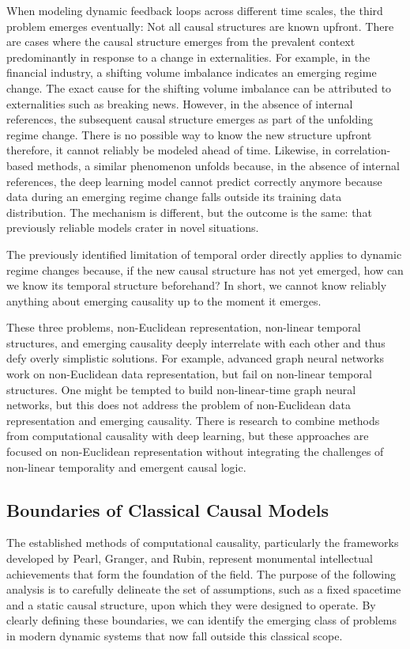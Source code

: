 When modeling dynamic feedback loops across different time scales, the third problem emerges eventually: Not all causal structures are known upfront. There are cases where the causal structure emerges from the prevalent context predominantly in response to a change in externalities. For example, in the financial industry, a shifting volume imbalance indicates an emerging regime change. The exact cause for the shifting volume imbalance can be attributed to externalities such as breaking news. However, in the absence of internal references, the subsequent  causal structure emerges as part of the unfolding regime change. There is no possible way to know the new structure upfront therefore, it cannot reliably be modeled ahead of time. Likewise, in correlation-based methods, a similar phenomenon unfolds because, in the absence of internal references, the deep learning model cannot predict correctly anymore because data during an emerging regime change falls outside its training data distribution. The mechanism is different, but the outcome is the same: that previously reliable models crater in novel situations.

The previously identified limitation of temporal order directly applies to dynamic regime changes because, if the new causal structure has not yet emerged, how can we know its temporal structure beforehand? In short, we cannot know reliably anything about emerging causality up to the moment it emerges.

These three problems, non-Euclidean representation, non-linear temporal structures, and emerging causality deeply interrelate with each other and thus defy overly simplistic solutions. For example, advanced graph neural networks work on non-Euclidean data representation, but fail on non-linear temporal structures. One might be tempted to build non-linear-time graph neural networks, but this does not address the problem of non-Euclidean data representation and emerging causality. There is research to combine methods from computational causality with deep learning, but these approaches are focused on non-Euclidean representation without integrating the challenges of non-linear temporality and emergent causal logic.

\subsection{Boundaries of Classical Causal Models}

The established methods of computational causality, particularly the frameworks developed by Pearl, Granger, and Rubin, represent monumental intellectual achievements that form the foundation of the field. The purpose of the following analysis is to carefully delineate the set of assumptions, such as a fixed spacetime and a static causal structure, upon which they were designed to operate. By clearly defining these boundaries, we can identify the emerging class of problems in modern dynamic systems that now fall outside this classical scope. 


